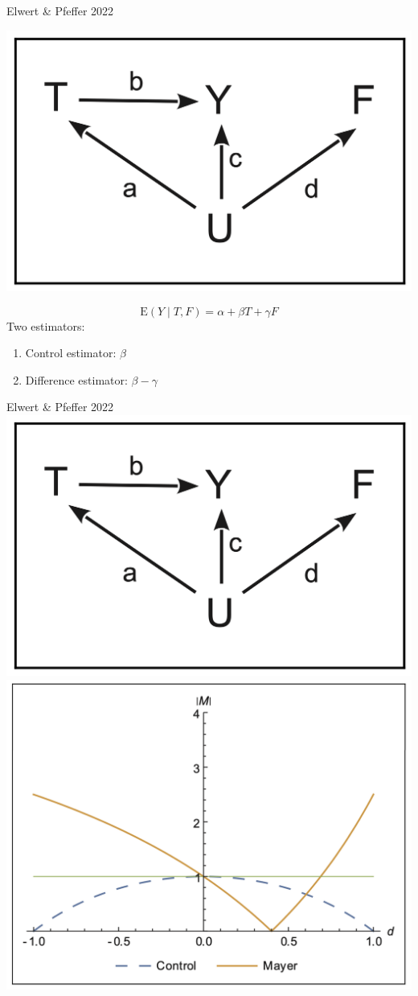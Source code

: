 \documentclass{beamer}
\newcommand\E{\text{E}}
\begin{document}
\begin{frame}{Elwert \& Pfeffer 2022}
\begin{center}
\includegraphics[width = .4\textwidth]{figures/ep_fig1}
\end{center}
$$\E(Y\mid T, F) = \alpha + \beta T + \gamma F$$
Two estimators:
\begin{enumerate}
\item Control estimator: $\beta$
\item Difference estimator: $\beta - \gamma$
\end{enumerate}
\end{frame}

\begin{frame}{Elwert \& Pfeffer 2022}
\centering
\includegraphics[width = .4\textwidth]{figures/ep_fig1}
\includegraphics[width = .5\textwidth]{figures/ep_fig3}
\end{frame}
\end{document}
